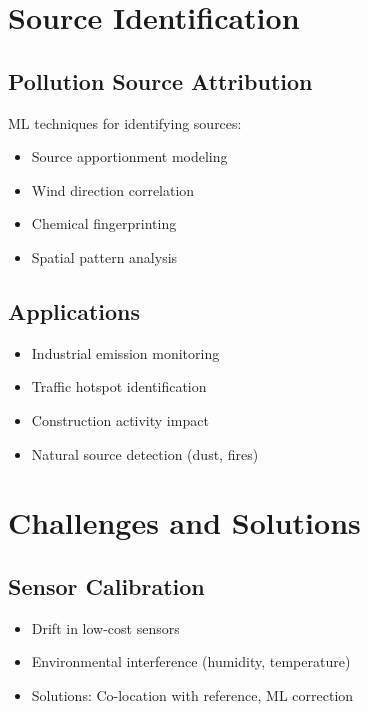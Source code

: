 \documentclass[12pt,a4paper]{article}
\begin{document}
\section{Source Identification}

\subsection{Pollution Source Attribution}

ML techniques for identifying sources:
\begin{itemize}
    \item Source apportionment modeling
    \item Wind direction correlation
    \item Chemical fingerprinting
    \item Spatial pattern analysis
\end{itemize}

\subsection{Applications}

\begin{itemize}
    \item Industrial emission monitoring
    \item Traffic hotspot identification
    \item Construction activity impact
    \item Natural source detection (dust, fires)
\end{itemize}

\section{Challenges and Solutions}

\subsection{Sensor Calibration}

\begin{itemize}
    \item Drift in low-cost sensors
    \item Environmental interference (humidity, temperature)
    \item Solutions: Co-location with reference, ML correction
\end{itemize}
\end{document}
